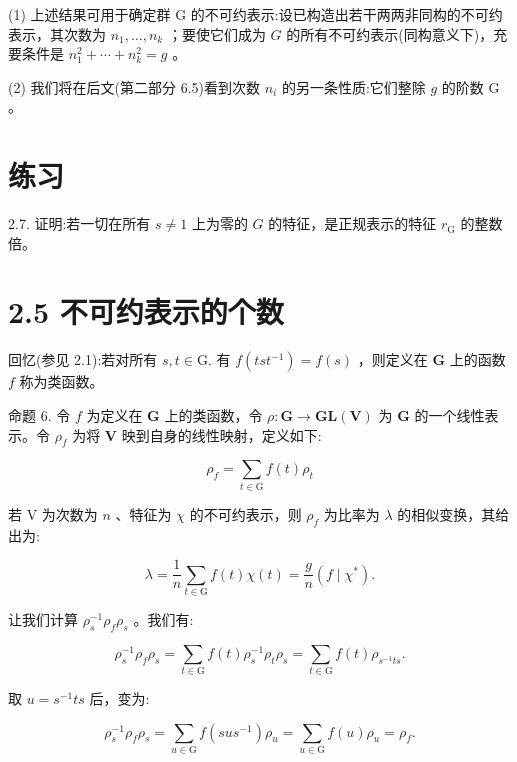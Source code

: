 \documentclass[10pt]{article}
\begin{document}
(1) 上述结果可用于确定群 G 的不可约表示:设已构造出若干两两非同构的不可约表示，其次数为 \({n}_{1},\ldots ,{n}_{k}\) ；要使它们成为 \(G\) 的所有不可约表示(同构意义下)，充要条件是 \({n}_{1}^{2} + \cdots  + {n}_{k}^{2} = g\) 。

(2) 我们将在后文(第二部分 6.5)看到次数 \({n}_{i}\) 的另一条性质:它们整除 \(g\) 的阶数 \(\mathrm{G}\) 。

\section*{练习}

2.7. 证明:若一切在所有 \(s \neq  1\) 上为零的 \(G\) 的特征，是正规表示的特征 \({r}_{\mathrm{G}}\) 的整数倍。

\section*{2.5 不可约表示的个数}

回忆(参见 2.1):若对所有 \(s,t \in  \mathrm{G}.\) 有 \(f\left( {{ts}{t}^{-1}}\right)  = f\left( s\right)\) ，则定义在 \(\mathbf{G}\) 上的函数 \(f\) 称为类函数。

命题 6. 令 \(f\) 为定义在 \(\mathbf{G}\) 上的类函数，令 \(\rho  : \mathbf{G} \rightarrow  \mathbf{{GL}}\left( \mathbf{V}\right)\) 为 \(\mathbf{G}\) 的一个线性表示。令 \({\rho }_{f}\) 为将 \(\mathbf{V}\) 映到自身的线性映射，定义如下:

\[
{\rho }_{f} = \mathop{\sum }\limits_{{t \in  \mathrm{G}}}f\left( t\right) {\rho }_{t}
\]

若 \(\mathrm{V}\) 为次数为 \(n\) 、特征为 \(\chi\) 的不可约表示，则 \({\rho }_{f}\) 为比率为 \(\lambda\) 的相似变换，其给出为:

\[
\lambda  = \frac{1}{n}\mathop{\sum }\limits_{{t \in  \mathrm{G}}}f\left( t\right) \chi \left( t\right)  = \frac{g}{n}\left( {f \mid  {\chi }^{ * }}\right) .
\]

让我们计算 \({\rho }_{s}^{-1}{\rho }_{f}{\rho }_{s}\) 。我们有:

\[
{\rho }_{s}^{-1}{\rho }_{f}{\rho }_{s} = \mathop{\sum }\limits_{{t \in  \mathrm{G}}}f\left( t\right) {\rho }_{s}^{-1}{\rho }_{t}{\rho }_{s} = \mathop{\sum }\limits_{{t \in  \mathrm{G}}}f\left( t\right) {\rho }_{{s}^{-1}{ts}}.
\]

取 \(u = {s}^{-1}{ts}\) 后，变为:

\[
{\rho }_{s}^{-1}{\rho }_{f}{\rho }_{s} = \mathop{\sum }\limits_{{u \in  \mathrm{G}}}f\left( {{su}{s}^{-1}}\right) {\rho }_{u} = \mathop{\sum }\limits_{{u \in  \mathrm{G}}}f\left( u\right) {\rho }_{u} = {\rho }_{f}.
\]
\end{document}
